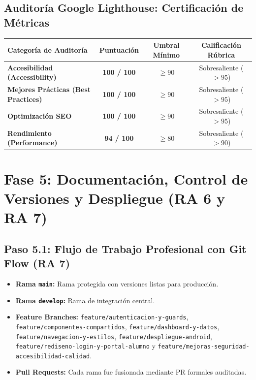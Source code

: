 \documentclass[11pt,a4paper]{article}
\begin{document}
\subsection{Auditoría Google Lighthouse: Certificación de Métricas}
\begin{center}
\begin{tabularx}{0.9\textwidth}{X c c c}
\toprule
\textbf{Categoría de Auditoría} & \textbf{Puntuación} & \textbf{Umbral Mínimo} & \textbf{Calificación Rúbrica} \\
\midrule
\textbf{Accesibilidad (Accessibility)}  & \textbf{100 / 100} & $\ge 90$ & Sobresaliente ($>95$) \\
\textbf{Mejores Prácticas (Best Practices)} & \textbf{100 / 100} & $\ge 90$ & Sobresaliente ($>95$) \\
\textbf{Optimización SEO}   & \textbf{100 / 100} & $\ge 90$ & Sobresaliente ($>95$) \\
\textbf{Rendimiento (Performance)} & \textbf{94 / 100}  & $\ge 80$ & Sobresaliente ($>90$) \\
\bottomrule
\end{tabularx}
\end{center}

\section{Fase 5: Documentación, Control de Versiones y Despliegue (RA 6 y RA 7)}
\label{sec:fase5}

\subsection{Paso 5.1: Flujo de Trabajo Profesional con Git Flow (RA 7)}
\begin{itemize}[leftmargin=*]
    \item \textbf{Rama \texttt{main}:} Rama protegida con versiones listas para producción.
    \item \textbf{Rama \texttt{develop}:} Rama de integración central.
    \item \textbf{Feature Branches:} \texttt{feature/autenticacion-y-guards}, \texttt{feature/componentes-compartidos}, \texttt{feature/dashboard-y-datos}, \texttt{feature/navegacion-y-estilos}, \texttt{feature/despliegue-android}, \texttt{feature/rediseno-login-y-portal-alumno} y \texttt{feature/mejoras-seguridad-accesibilidad-calidad}.
    \item \textbf{Pull Requests:} Cada rama fue fusionada mediante PR formales auditadas.
\end{itemize}
\end{document}
